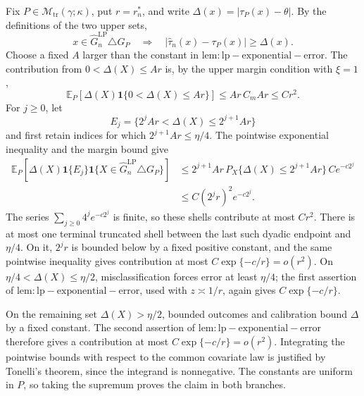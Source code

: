 Fix \(P\in\mathcal M_{\mathrm{tr}}(\gamma;\kappa)\), put \(r=r_n^*\), and write \(\Delta(x)=|\tau_P(x)-\theta|\). By the definitions of the two upper sets,
\[
x\in\widehat G_n^{\mathrm{LP}}\triangle G_P
\quad\Longrightarrow\quad
|\widehat\tau_n(x)-\tau_P(x)|\ge\Delta(x).
\]
Choose a fixed \(A\) larger than the constant in \(\mathrm{lem:lp-exponential-error}\). The contribution from \(0<\Delta(X)\le Ar\) is, by the upper margin condition with \(\xi=1\),
\[
\mathbb E_P\!\left[\Delta(X)\mathbf 1\{0<\Delta(X)\le Ar\}\right]
\le Ar\,C_mAr\le Cr^2.
\]
For \(j\ge0\), let
\[
E_j=\{2^jAr<\Delta(X)\le2^{j+1}Ar\}
\]
and first retain indices for which \(2^{j+1}Ar\le\eta/4\). The pointwise exponential inequality and the margin bound give
\[
\begin{aligned}
\mathbb E_P\!\left[\Delta(X)\mathbf 1\{E_j\}
 \mathbf 1\{X\in\widehat G_n^{\mathrm{LP}}\triangle G_P\}\right]
&\le 2^{j+1}Ar\,P_X\{\Delta(X)\le2^{j+1}Ar\}\,Ce^{-c2^j}\\
&\le C(2^jr)^2e^{-c2^j}.
\end{aligned}
\]
The series \(\sum_{j\ge0}4^je^{-c2^j}\) is finite, so these shells contribute at most \(Cr^2\). There is at most one terminal truncated shell between the last such dyadic endpoint and \(\eta/4\). On it, \(2^jr\) is bounded below by a fixed positive constant, and the same pointwise inequality gives contribution at most \(C\exp\{-c/r\}=o(r^2)\). On \(\eta/4<\Delta(X)\le\eta/2\), misclassification forces error at least \(\eta/4\); the first assertion of \(\mathrm{lem:lp-exponential-error}\), used with \(z\asymp1/r\), again gives \(C\exp\{-c/r\}\).

On the remaining set \(\Delta(X)>\eta/2\), bounded outcomes and calibration bound \(\Delta\) by a fixed constant. The second assertion of \(\mathrm{lem:lp-exponential-error}\) therefore gives a contribution at most \(C\exp\{-c/r\}=o(r^2)\). Integrating the pointwise bounds with respect to the common covariate law is justified by Tonelli's theorem, since the integrand is nonnegative. The constants are uniform in \(P\), so taking the supremum proves the claim in both branches.